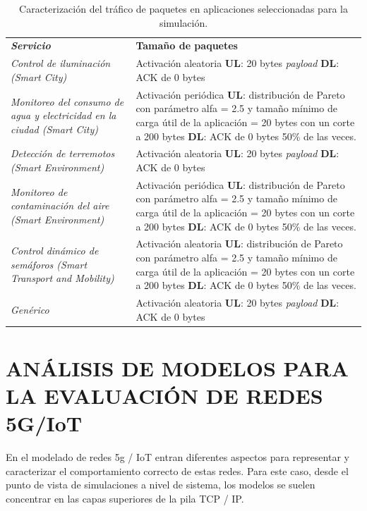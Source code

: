\begin{table}
\caption{Caracterización del tráfico de paquetes en aplicaciones seleccionadas para la simulación.}
\label{tab:trafpkt}
\centering
\begin{tabular}{*{2}{m{7cm}}}\\ 
\textbf{\textit{Servicio}} & \textbf{Tamaño de paquetes} \\ 
\textit{Control de iluminación (Smart City) } & \footnotesize{ Activación aleatoria \textbf{UL}: 20 bytes \textit{payload} \textbf{DL}: ACK de 0 bytes } \\ \hline 
\textit{Monitoreo del consumo de agua y electricidad en la ciudad (Smart City) } & \footnotesize{ Activación periódica \textbf{UL}: distribución de Pareto con parámetro alfa = 2.5 y tamaño mínimo de carga útil de la aplicación = 20 bytes con un corte a 200 bytes \textbf{DL}: ACK de 0 bytes 50\% de las veces. } \\ \hline 
\textit{Detección de terremotos (Smart Environment)}  & \footnotesize{ Activación aleatoria \textbf{UL}: 20 bytes \textit{payload} \textbf{DL}: ACK de 0 bytes } \\ \hline 
\textit{Monitoreo de contaminación del aire (Smart Environment) } & \footnotesize{ Activación periódica \textbf{UL}: distribución de Pareto con parámetro alfa = 2.5 y tamaño mínimo de carga útil de la aplicación = 20 bytes con un corte a 200 bytes \textbf{DL}: ACK de 0 bytes 50\% de las veces. } \\ \hline 
\textit{Control dinámico de semáforos (Smart Transport and Mobility)}  & \footnotesize{ Activación aleatoria \textbf{UL}: distribución de Pareto con parámetro alfa = 2.5 y tamaño mínimo de carga útil de la aplicación = 20 bytes con un corte a 200 bytes \textbf{DL}: ACK de 0 bytes 50\% de las veces. } \\ \hline 
\textit{Genérico}  & \footnotesize{ Activación aleatoria \textbf{UL}: 20 bytes \textit{payload} \textbf{DL}: ACK de 0 bytes } \\  
\end{tabular}
\end{table}

\break

\section{ANÁLISIS DE MODELOS PARA LA EVALUACIÓN DE REDES 5G/IoT}
En el modelado de redes 5g / IoT entran diferentes aspectos para representar y caracterizar el comportamiento correcto de estas redes. Para este caso, desde el punto de vista de simulaciones a nivel de sistema, los modelos se suelen concentrar en las capas superiores de la pila TCP / IP.\newline

